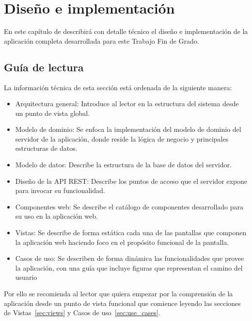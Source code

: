 \documentclass[a4paper, 12pt]{book}
\begin{document}

    \cleardoublepage


    \chapter{Diseño e implementación}

    En este capítulo de describirá con detalle técnico el diseño e implementación de la aplicación completa desarrollada para este Trabajo Fin de Grado.


    \section{Guía de lectura}
    \label{sec:read_guide}
    La información técnica de esta sección está ordenada de la siguiente manera:
    \begin{itemize}
        \item Arquitectura general: Introduce al lector en la estructura del sistema desde un punto de vista global.
        \item Modelo de dominio: Se enfoca la implementación del modelo de dominio del servidor de la aplicación, donde reside la lógica de negocio y principales estructuras de datos.
        \item Modelo de datos: Describe la estructura de la base de datos del servidor.
        \item Diseño de la API REST: Describe los puntos de acceso que el servidor expone para invocar su funcionalidad.
        \item Componentes web: Se describe el catálogo de componentes desarrollado para su uso en la aplicación web.
        \item Vistas: Se describe de forma estática cada una de las pantallas que componen la aplicación web haciendo foco en el propósito funcional de la pantalla.
        \item Casos de uso: Se describen de forma dinámica las funcionalidades que provee la aplicación, con una guía que incluye figuras que representan el camino del usuario
    \end{itemize}

    Por ello se recomienda al lector que quiera empezar por la comprensión de la aplicación desde un punto de vista funcional que
    comience leyendo las secciones de Vistas~\ref{sec:views} y Casos de uso~\ref{sec:use_cases}.
\end{document}
